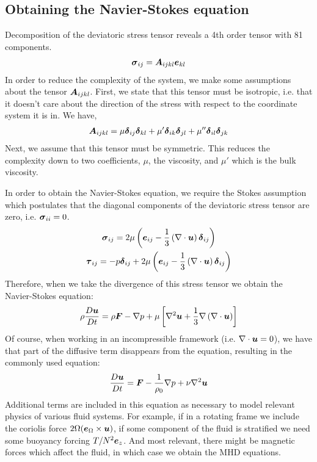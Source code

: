 \documentclass{article}
\begin{document}
\subsection{Obtaining the Navier-Stokes equation}

Decomposition of the deviatoric stress tensor reveals a 4th order tensor with 81
components.
\begin{gather*}
    \boldsymbol{\sigma}_{ij} = \boldsymbol{A}_{ijkl}\boldsymbol{e}_{kl}
\end{gather*}
In order to reduce the complexity of the system, we make some assumptions about
the tensor $\boldsymbol{A}_{ijkl}$. First, we state that this tensor must be isotropic,
i.e. that it doesn't care about the direction of the stress with respect to the
coordinate system it is in. We have, 
\begin{gather*}
    \boldsymbol{A}_{ijkl} = \mu \boldsymbol{\delta}_{ij}\boldsymbol{\delta}_{kl} +
    \mu'\boldsymbol{\delta}_{ik}\boldsymbol{\delta}_{jl} +
    \mu''\boldsymbol{\delta}_{il}\boldsymbol{\delta}_{jk}
\end{gather*}
Next, we assume that this tensor must be symmetric. This reduces the complexity
down to two coefficients, $\mu$, the viscosity, and $\mu'$ which is the bulk viscosity. 

In order to obtain the Navier-Stokes equation, we require the Stokes assumption
which postulates that the diagonal components of the deviatoric stress tensor
are zero, i.e. $\boldsymbol{\sigma}_{ii} = 0$. 
\begin{gather*}
    \boldsymbol{\sigma}_{ij} = 2\mu\left(\boldsymbol{e}_{ij} -
    \frac{1}{3}\left(\nabla\cdot\boldsymbol{u}\right)\boldsymbol{\delta}_{ij}\right)    \\
    \boldsymbol{\tau}_{ij} = -p\boldsymbol{\delta}_{ij} + 2\mu\left(\boldsymbol{e}_{ij} -
    \frac{1}{3}\left(\nabla \cdot \boldsymbol{u}\right)\boldsymbol{\delta}_{ij}\right)
\end{gather*}
Therefore, when we take the divergence of this stress tensor we obtain the
Navier-Stokes equation:
\begin{gather*}
    \rho\frac{D \boldsymbol{u}}{D t} = \rho\boldsymbol{F} - \nabla p + \mu\left[ \nabla^2 \boldsymbol{u} +
    \frac{1}{3}\nabla \left(\nabla \cdot \boldsymbol{u}\right)\right]
\end{gather*}
Of course, when working in an incompressible framework (i.e. $\nabla\cdot\boldsymbol{u} =
0$), we have that part of the diffusive term disappears from the equation,
resulting in the commonly used equation:
\begin{gather}
    \label{eq:NS}
    \frac{D \boldsymbol{u}}{D t} = \boldsymbol{F} - \frac{1}{\rho_0}\nabla p + \nu\nabla^2 \boldsymbol{u}
\end{gather}
Additional terms are included in this equation as necessary to model relevant
physics of various fluid systems. For example, if in a rotating frame we include
the coriolis force $2\Omega(\boldsymbol{e}_{\Omega} \times \boldsymbol{u})$, if some component of
the fluid is stratified we need some buoyancy forcing $T/N^2\boldsymbol{e}_z$. And most
relevant, there might be magnetic forces which affect the fluid, in which case
we obtain the MHD equations. 
\end{document}
